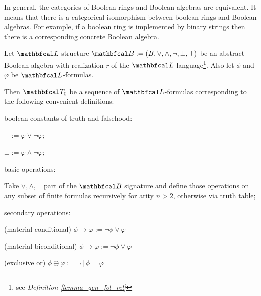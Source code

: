 In general, the categories of Boolean rings and Boolean algebras are equivalent. It means that there is a categorical isomorphism between boolean rings and Boolean algebras. For example, if a boolean ring is implemented by binary strings then there is a corresponding concrete Boolean algebra.


\begin{definition}\label{def_bt_fol}
  Let $\lsign$-structure $\LsB := (B, \lor, \land, \neg, \bot, \top)$ be an abstract Boolean algebra with realization $r$ of the $\lsign$-language\footnote{see \textit{Definition \ref{lemma_gen_fol_rel}}}. Also let $\phi$ and $\varphi$ be $\lsign$-formulas. 

  Then $\LsT_0$ be a sequence of $\lsign$-formulas corresponding to the following convenient definitions:
  \begin{legal}
    \item boolean constants of truth and falsehood:
      \begin{legal} 
      \item $\top := \varphi \lor \neg \varphi$;
      \item $\bot := \varphi \land \neg \varphi$;
      \end{legal}
    \item basic operations:
      \begin{legal} 
        \item Take $\lor, \land, \neg$ part of the $\LsB$ signature and define those operations on any subset of finite formulas recursively for arity $n>2$, otherwise via truth table;
      \end{legal} 
    \item secondary operations:
      \begin{legal} 
      \item (material conditional) $\phi \rightarrow \varphi := \neg \phi \lor \varphi$
      \item (material biconditional) $\phi \rightarrow \varphi := \neg \phi \lor \varphi$
      \item (exclusive or) $\phi \oplus \varphi := \neg [\phi = \varphi]$

\end{legal}
\end{legal}
\end{definition}
